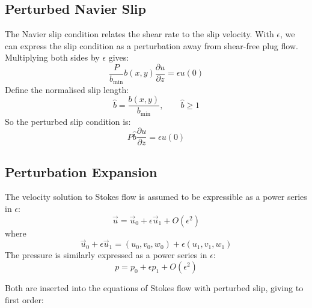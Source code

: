 \documentclass[12pt, a4paper, twoside, openright]{book}
\newcommand{\bmin}{\ensuremath{b_{\mathrm{min}}}}
\begin{document}

\clearpage



\subsection{Perturbed Navier Slip}

The Navier slip condition relates the shear rate to the slip velocity.  With $\epsilon$, we can express the slip condition as a perturbation away from shear-free plug flow.  Multiplying both sides by $\epsilon$ gives:
\begin{equation}
\frac{P}{\bmin} b(x,y) \frac{\partial u }{\partial z} = \epsilon u(0)
\end{equation}
Define the normalised slip length:
\begin{equation}
\hat{b} = \frac{b(x,y)}{\bmin},   \qquad \hat{b} \geq 1
\end{equation}
So the perturbed slip condition is:
\begin{equation}
P \hat{b} \frac{\partial u}{\partial z} = \epsilon u(0)
\end{equation}


\subsection{Perturbation Expansion}

The velocity solution to Stokes flow is assumed to be expressible as a power series in $\epsilon$:
\begin{equation}
\vec{u} = \vec{u}_0 + \epsilon \vec{u}_1 + O(\epsilon^2)
\end{equation}
where
\begin{equation}
\vec{u}_0 + \epsilon \vec{u}_1 = (u_0, v_0, w_0) + \epsilon(u_1, v_1, w_1)
\end{equation}
The pressure is similarly expressed as a power series in $\epsilon$:
\begin{equation}
p = p_0 + \epsilon p_1 + O(\epsilon^2)
\end{equation}

Both are inserted into the equations of Stokes flow with perturbed slip, giving to first order:
\end{document}
